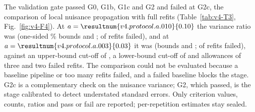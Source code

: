 The validation gate passed G0, G1b, G1c and G2 and failed at G2c, the comparison of local nuisance propagation with full refits (Table~\ref{tab:v4-T3}, Fig.~\ref{fig:v4-F4}). %
At $a=\resultnum{v4.protocol.a.010}{0.10}$ the variance ratio was  (one-sided \% bounds  and ;  of  refits failed), and at $a=\resultnum{v4.protocol.a.003}{0.03}$ it was  (bounds  and ;  of  refits failed), against an upper-bound cut-off of , a lower-bound cut-off of  and allowances of three and two failed refits. %
The comparison could not be evaluated because a baseline pipeline or too many refits failed, and a failed baseline blocks the stage. %
G2c is a complementary check on the nuisance variance; G2, which passed, is the stage calibrated to detect understated standard errors. %
Only criterion values, counts, ratios and pass or fail are reported; per-repetition estimates stay sealed. %


